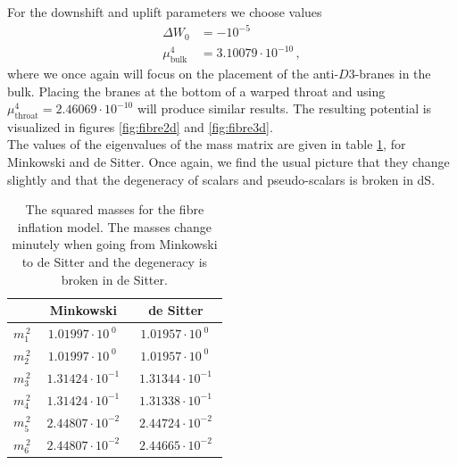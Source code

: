 \documentclass[a4paper,12pt,twoside,openright]{report}
\newcommand{\bea}{\begin{equation}\begin{aligned}}
\newcommand{\eea}{\end{aligned}\end{equation}}
\begin{document}
For the downshift and uplift parameters we choose values
\bea
\Delta W_0 &= - 10^{-5}\\
\mu^4_{\text{bulk}} &= 3.10079 \cdot 10^{-10}\,,
\eea
where we once again will focus on the placement of the anti-$D3$-branes in the bulk. Placing the branes at the bottom of a warped throat and using $\mu^4_{\text{throat}} = 2.46069 \cdot 10^{-10}$ will produce similar results. The resulting potential is visualized in figures \ref{fig:fibre2d} and \ref{fig:fibre3d}.\\
The values of the eigenvalues of the mass matrix are given in table \ref{tab:fibremass}, for Minkowski and de Sitter. Once again, we find the usual picture that they change slightly and that the degeneracy of scalars and pseudo-scalars is broken in dS.
\begin{table}[H]
\centering
\begin{tabular}{|c|c|c|}\hline
&  Minkowski  & de Sitter \\\hline
$m_1^{\,2}$ & $\; 1.01997 \cdot 10^{\;0} \,\;$ & $\; 1.01957 \cdot 10^{\;0} \,\;$\\\hline
$m_2^{\,2}$ & $\; 1.01997 \cdot 10^{\;0} \,\;$ & $\; 1.01957\cdot 10^{\;0}  \,\;$\\\hline
$m_3^{\,2}$ & $\; 1.31424 \cdot 10^{-1} \;$ & $\; 1.31344 \cdot 10^{-1} \;$\\\hline
$m_4^{\,2}$ & $\; 1.31424 \cdot 10^{-1} \;$ & $\; 1.31338 \cdot 10^{-1} \;$\\\hline
$m_5^{\,2}$ & $\; 2.44807 \cdot 10^{-2} \;$ & $\; 2.44724 \cdot 10^{-2} \;$\\\hline
$m_6^{\,2}$ & $\; 2.44807 \cdot 10^{-2} \;$ & $\; 2.44665 \cdot 10^{-2} \;$\\\hline
\end{tabular}
\caption{The squared masses for the fibre inflation model. The masses change minutely when going from Minkowski to de Sitter and the degeneracy is broken in de Sitter.}
\label{tab:fibremass}
\end{table}
\end{document}
